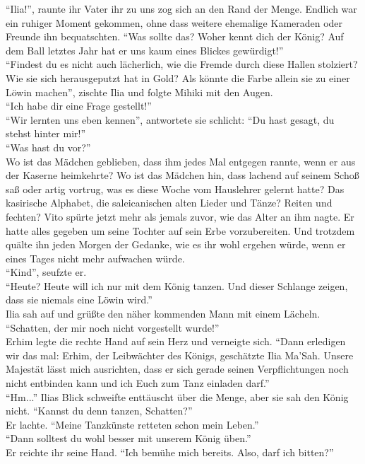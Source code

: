``Ilia!'', raunte ihr Vater ihr zu uns zog sich an den Rand der Menge. Endlich war ein ruhiger 
Moment gekommen, ohne dass weitere ehemalige Kameraden oder Freunde ihn bequatschten. ``Was sollte 
das? Woher kennt dich der König? Auf dem Ball letztes Jahr hat er uns kaum eines Blickes 
gewürdigt!''\\
``Findest du es nicht auch lächerlich, wie die Fremde durch diese Hallen stolziert? Wie sie sich 
herausgeputzt hat in Gold? Als könnte die Farbe allein sie zu einer Löwin machen'', zischte Ilia 
und folgte Mihiki mit den Augen.\\
``Ich habe dir eine Frage gestellt!''\\
``Wir lernten uns eben kennen'', antwortete sie schlicht: ``Du hast gesagt, du stehst hinter 
mir!''\\
``Was hast du vor?''\\
Wo ist das Mädchen geblieben, dass ihm jedes Mal entgegen rannte, wenn er aus 
der Kaserne heimkehrte? Wo ist das Mädchen hin, dass lachend auf seinem Schoß saß oder artig 
vortrug, was es diese Woche vom Hauslehrer gelernt hatte? Das kasirische Alphabet, die 
saleicanischen alten Lieder und Tänze? Reiten und fechten? Vito spürte jetzt mehr als jemals 
zuvor, wie das Alter an ihm nagte. Er hatte alles gegeben um seine Tochter auf sein Erbe 
vorzubereiten. Und trotzdem quälte ihn jeden Morgen der Gedanke, wie es ihr wohl ergehen würde, 
wenn er eines Tages nicht mehr aufwachen würde.\\
``Kind'', seufzte er.\\
``Heute? Heute will ich nur mit dem König tanzen. Und dieser Schlange zeigen, dass sie niemals eine 
Löwin wird.''\\
Ilia sah auf und grüßte den näher kommenden Mann mit einem Lächeln. ``Schatten, der mir noch nicht 
vorgestellt wurde!''\\
Erhim legte die rechte Hand auf sein Herz und verneigte sich. ``Dann erledigen wir das 
mal: Erhim, der Leibwächter des Königs, geschätzte Ilia Ma'Sah. Unsere Majestät lässt mich 
ausrichten, dass er sich gerade seinen Verpflichtungen noch nicht entbinden kann und ich Euch zum 
Tanz einladen darf.''\\
``Hm...'' Ilias Blick schweifte enttäuscht über die Menge, aber sie sah den König nicht. ``Kannst 
du denn tanzen, Schatten?''\\
Er lachte. ``Meine Tanzkünste retteten schon mein Leben.''\\
``Dann solltest du wohl besser mit unserem König üben.''\\
Er reichte ihr seine Hand. ``Ich bemühe mich bereits. Also, darf ich bitten?''\\

